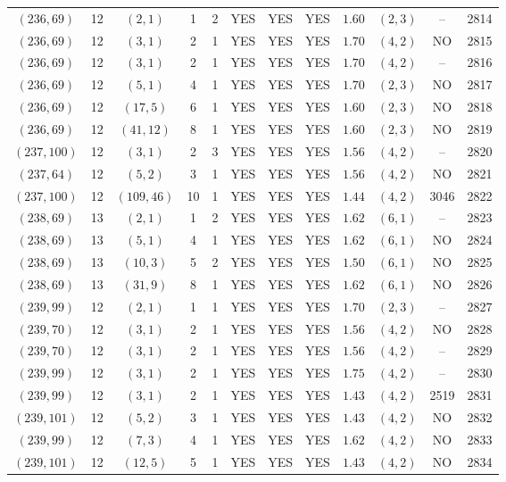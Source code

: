 \begin{longtable}{|c|c|c|c|c|c|c|c|c|c|c|c|}
$(236,69)$ & 12 & $(2,1)$ & 1 & 2 & YES & YES & YES & $1.60$ & $(2,3)$ & -- & 2814\\
$(236,69)$ & 12 & $(3,1)$ & 2 & 1 & YES & YES & YES & $1.70$ & $(4,2)$ & NO & 2815\\
$(236,69)$ & 12 & $(3,1)$ & 2 & 1 & YES & YES & YES & $1.70$ & $(4,2)$ & -- & 2816\\
$(236,69)$ & 12 & $(5,1)$ & 4 & 1 & YES & YES & YES & $1.70$ & $(2,3)$ & NO & 2817\\
$(236,69)$ & 12 & $(17,5)$ & 6 & 1 & YES & YES & YES & $1.60$ & $(2,3)$ & NO & 2818\\
$(236,69)$ & 12 & $(41,12)$ & 8 & 1 & YES & YES & YES & $1.60$ & $(2,3)$ & NO & 2819\\
$(237,100)$ & 12 & $(3,1)$ & 2 & 3 & YES & YES & YES & $1.56$ & $(4,2)$ & -- & 2820\\
$(237,64)$ & 12 & $(5,2)$ & 3 & 1 & YES & YES & YES & $1.56$ & $(4,2)$ & NO & 2821\\
$(237,100)$ & 12 & $(109,46)$ & 10 & 1 & YES & YES & YES & $1.44$ & $(4,2)$ & 3046 & 2822\\
$(238,69)$ & 13 & $(2,1)$ & 1 & 2 & YES & YES & YES & $1.62$ & $(6,1)$ & -- & 2823\\
$(238,69)$ & 13 & $(5,1)$ & 4 & 1 & YES & YES & YES & $1.62$ & $(6,1)$ & NO & 2824\\
$(238,69)$ & 13 & $(10,3)$ & 5 & 2 & YES & YES & YES & $1.50$ & $(6,1)$ & NO & 2825\\
$(238,69)$ & 13 & $(31,9)$ & 8 & 1 & YES & YES & YES & $1.62$ & $(6,1)$ & NO & 2826\\
$(239,99)$ & 12 & $(2,1)$ & 1 & 1 & YES & YES & YES & $1.70$ & $(2,3)$ & -- & 2827\\
$(239,70)$ & 12 & $(3,1)$ & 2 & 1 & YES & YES & YES & $1.56$ & $(4,2)$ & NO & 2828\\
$(239,70)$ & 12 & $(3,1)$ & 2 & 1 & YES & YES & YES & $1.56$ & $(4,2)$ & -- & 2829\\
$(239,99)$ & 12 & $(3,1)$ & 2 & 1 & YES & YES & YES & $1.75$ & $(4,2)$ & -- & 2830\\
$(239,99)$ & 12 & $(3,1)$ & 2 & 1 & YES & YES & YES & $1.43$ & $(4,2)$ & 2519 & 2831\\
$(239,101)$ & 12 & $(5,2)$ & 3 & 1 & YES & YES & YES & $1.43$ & $(4,2)$ & NO & 2832\\
$(239,99)$ & 12 & $(7,3)$ & 4 & 1 & YES & YES & YES & $1.62$ & $(4,2)$ & NO & 2833\\
$(239,101)$ & 12 & $(12,5)$ & 5 & 1 & YES & YES & YES & $1.43$ & $(4,2)$ & NO & 2834\\

\end{longtable}
